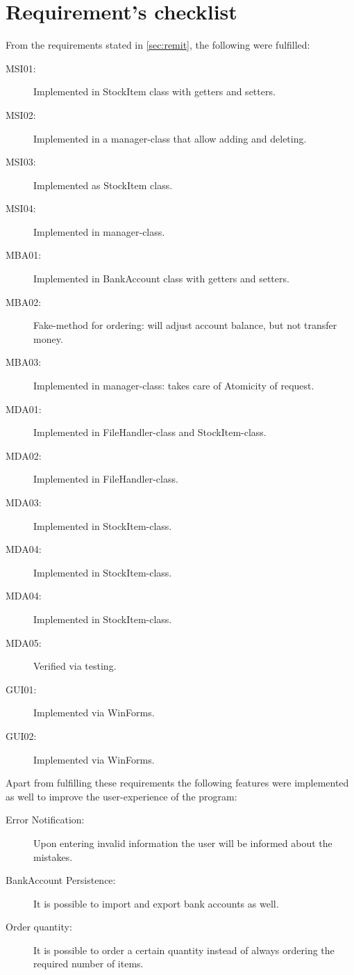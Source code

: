 \chapter{Requirement's checklist}\label{ch:requirements} %

From the requirements stated in \autoref{sec:remit}, the following were fulfilled:

\begin{description}
\item[MSI01:] Implemented in StockItem class with getters and setters.
\item[MSI02:] Implemented in a manager-class that allow adding and deleting.
\item[MSI03:] Implemented as StockItem class.
\item[MSI04:] Implemented in manager-class.
\item[MBA01:] Implemented in BankAccount class with getters and setters.
\item[MBA02:] Fake-method for ordering: will adjust account balance, but not transfer money.
\item[MBA03:] Implemented in manager-class: takes care of Atomicity of request.
\item[MDA01:] Implemented in FileHandler-class and StockItem-class.
\item[MDA02:] Implemented in FileHandler-class.
\item[MDA03:] Implemented in StockItem-class.
\item[MDA04:] Implemented in StockItem-class.
\item[MDA04:] Implemented in StockItem-class.
\item[MDA05:] Verified via testing.
\item[GUI01:] Implemented via WinForms.
\item[GUI02:] Implemented via WinForms.
\end{description}

Apart from fulfilling these requirements the following features were implemented as well to improve the user-experience of the program:

\begin{description}
\item[Error Notification:] Upon entering invalid information the user will be informed about the mistakes.
\item[BankAccount Persistence:] It is possible to import and export bank accounts as well.
\item[Order quantity:] It is possible to order a certain quantity instead of always ordering the required number of items.
\end{description}